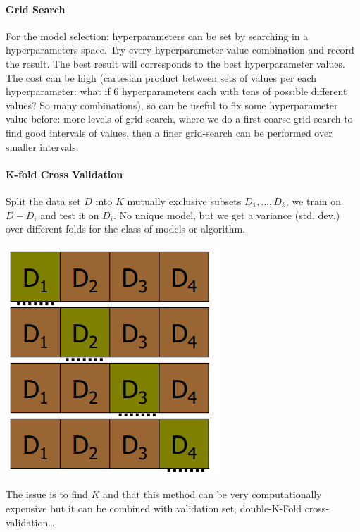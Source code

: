 \documentclass[10pt]{report}
\begin{document}
\paragraph{Grid Search} For the model selection: hyperparameters can be set by searching in a hyperparameters space. Try every hyperparameter-value combination and record the result. The best result will corresponds to the best hyperparameter values.\\
The cost can be high (cartesian product between sets of values per each hyperparameter: what if 6 hyperparameters each with tens of possible different values? So many combinations), so can be useful to fix some hyperparameter value before: more levels of grid search, where we do a first coarse grid search to find good intervals of values, then a finer grid-search can be performed over smaller intervals.
\paragraph{K-fold Cross Validation} Split the data set $D$ into $K$ mutually exclusive subsets $D_1,\ldots, D_k$, we train on $D - D_i$ and test it on $D_i$. No unique model, but we get a variance (std. dev.) over different folds for the class of models or algorithm.
\begin{center}
	\includegraphics[scale=0.5]{3.png}
\end{center}
The issue is to find $K$ and that this method can be very computationally expensive but it can be combined with validation set,  double-K-Fold cross-validation\ldots
\end{document}
